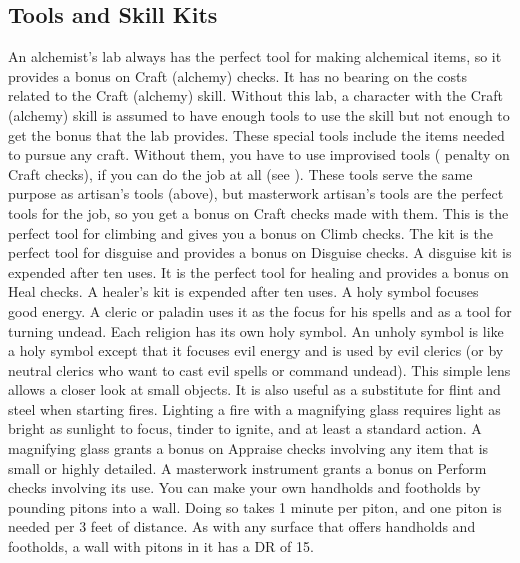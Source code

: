     \subsection{Tools and Skill Kits}
         An alchemist's lab always has the perfect tool for making alchemical items, so it provides a  bonus on Craft (alchemy) checks. It has no bearing on the costs related to the Craft (alchemy) skill. Without this lab, a character with the Craft (alchemy) skill is assumed to have enough tools to use the skill but not enough to get the  bonus that the lab provides.
         These special tools include the items needed to pursue any craft. Without them, you have to use improvised tools ( penalty on Craft checks), if you can do the job at all (see ).
         These tools serve the same purpose as artisan's tools (above), but masterwork artisan's tools are the perfect tools for the job, so you get a  bonus on Craft checks made with them.
         This is the perfect tool for climbing and gives you a  bonus on Climb checks.
         The kit is the perfect tool for disguise and provides a  bonus on Disguise checks. A disguise kit is expended after ten uses.
         It is the perfect tool for healing and provides a  bonus on Heal checks. A healer's kit is expended after ten uses.
         A holy symbol focuses good energy. A cleric or paladin uses it as the focus for his spells and as a tool for turning undead. Each religion has its own holy symbol.
         An unholy symbol is like a holy symbol except that it focuses evil energy and is used by evil clerics (or by neutral clerics who want to cast evil spells or command undead).
         This simple lens allows a closer look at small objects. It is also useful as a substitute for flint and steel when starting fires. Lighting a fire with a magnifying glass requires light as bright as sunlight to focus, tinder to ignite, and at least a standard action.
        A magnifying glass grants a  bonus on Appraise checks involving any item that is small or highly detailed.
         A masterwork instrument grants a  bonus on Perform checks involving its use.
         You can make your own handholds and footholds by pounding pitons into a wall. Doing so takes 1 minute per piton, and one piton is needed per 3 feet of distance. As with any surface that offers handholds and footholds, a wall with pitons in it has a DR of 15.
